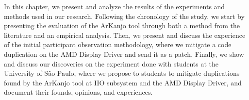 \en 

In this chapter, we present and analyze the results of the experiments and methods 
used in our research. Following the chronology of the study, we start by presenting the 
evaluation of the ArKanjo tool through both a method from the literature and an empirical 
analysis. Then, we present and discuss the experience of the initial participant 
observation methodology, where we mitigate a code duplication on the AMD Display Driver 
and send it as a patch. Finally, we show and discuss our discoveries on the experiment 
done with students at the University of São Paulo, where we propose to students to mitigate 
duplications found by the ArKanjo tool at IIO subsystem and the AMD Display Driver, and 
document their founds, opinions, and experiences.







